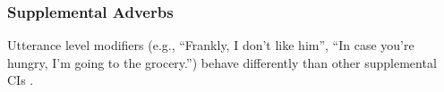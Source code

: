 \subsubsection{Supplemental Adverbs}


Utterance level modifiers (e.g., ``Frankly, I don't like him'', ``In case
you're hungry, I'm going to the grocery.'') behave differently than other
supplemental CIs \cite[cf.][pp.725-729]{amaral2007review}.


